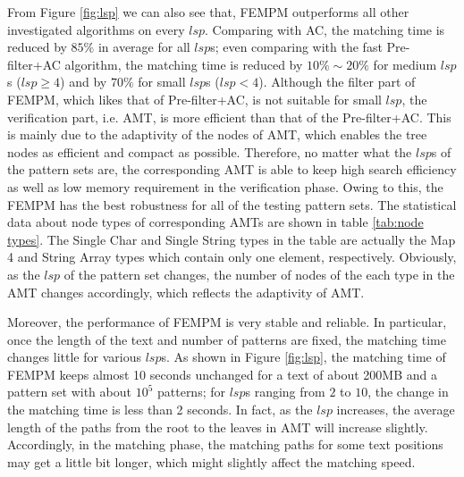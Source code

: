 \documentclass{article}
\begin{document}
From Figure \ref{fig:lsp} we can also see that, \textsf{FEMPM}
outperforms all other investigated algorithms on every
$lsp$. Comparing with \textsf{AC}, the matching time is reduced by
$85\%$ in average for all $lsp$s; even comparing with the fast
\textsf{Pre-filter+AC} algorithm, the matching time is reduced by
$10\% \sim 20\%$ for medium $lsp$s ($lsp \geq 4$) and by $70\%$ for
small $lsp$s ($lsp < 4$). Although the filter part of \textsf{FEMPM},
which likes that of \textsf{Pre-filter+AC}, is not suitable for small
$lsp$, the verification part, i.e. AMT, is more efficient than that of
the \textsf{Pre-filter+AC}. This is mainly due to the adaptivity of
the nodes of AMT, which enables the tree nodes as efficient and
compact as possible. Therefore, no matter what the $lsp$s of the
pattern sets are, the corresponding AMT is able to keep high search
efficiency as well as low memory requirement in the verification
phase. Owing to this, the \textsf{FEMPM} has the best robustness for
all of the testing pattern sets. The statistical data about node types
of corresponding AMTs are shown in table \ref{tab:node types}. The
Single Char and Single String types in the table are actually the Map
4 and String Array types which contain only one element,
respectively. Obviously, as the $lsp$ of the pattern set changes, the
number of nodes of the each type in the AMT changes accordingly, which
reflects the adaptivity of AMT.

Moreover, the performance of \textsf{FEMPM} is very stable and
reliable. In particular, once the length of the text and number of
patterns are fixed, the matching time changes little for various
$lsp$s. As shown in Figure \ref{fig:lsp}, the matching time of
\textsf{FEMPM} keeps almost 10 seconds unchanged for a text of about
200MB and a pattern set with about $10^5$ patterns; for $lsp$s ranging
from $2$ to $10$, the change in the matching time is less than 2
seconds. In fact, as the $lsp$ increases, the average length of the
paths from the root to the leaves in AMT will increase
slightly. Accordingly, in the matching phase, the matching paths for
some text positions may get a little bit longer, which might slightly
affect the matching speed.
\end{document}
